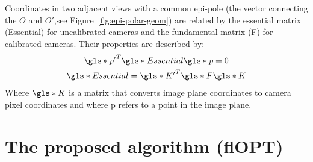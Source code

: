 \documentclass{osa-article}
\begin{document}
Coordinates in two adjacent views with a common epi-pole (the vector connecting the \(O\) and \(O'\),see Figure~\ref{fig:epi-polar-geom}) are related by the essential matrix (\gls*{Essential}) for uncalibrated cameras and the fundamental matrix (\gls*{F}) for calibrated cameras.
Their properties are described by:
\begin{gather}
  \gls*{p'}^T \gls*{Essential} \gls*{p} = 0 \label{eq:pEp}\\
  \gls*{Essential} = \gls*{K'}^T \gls*{F} \gls*{K} %
\end{gather}
Where \(\gls*{K}\) is a matrix that converts image plane coordinates to camera pixel coordinates and where \gls*{p} refers to a point in the image plane.

\section*{The proposed algorithm (flOPT)}
\end{document}
